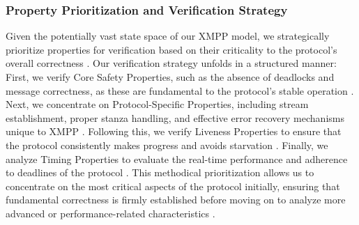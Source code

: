 \subsubsection{Property Prioritization and Verification Strategy}
Given the potentially vast state space of our XMPP model, we strategically prioritize properties for verification based on their criticality to the protocol's overall correctness \cite{clarke1997model}. Our verification strategy unfolds in a structured manner: First, we verify Core Safety Properties, such as the absence of deadlocks and message correctness, as these are fundamental to the protocol's stable operation \cite{baier2008principles}. Next, we concentrate on Protocol-Specific Properties, including stream establishment, proper stanza handling, and effective error recovery mechanisms unique to XMPP \cite{rfc6120}. Following this, we verify Liveness Properties to ensure that the protocol consistently makes progress and avoids starvation \cite{clarke1997model}. Finally, we analyze Timing Properties to evaluate the real-time performance and adherence to deadlines of the protocol \cite{alur1994theory}. This methodical prioritization allows us to concentrate on the most critical aspects of the protocol initially, ensuring that fundamental correctness is firmly established before moving on to analyze more advanced or performance-related characteristics \cite{baier2008principles,clarke1997model}.